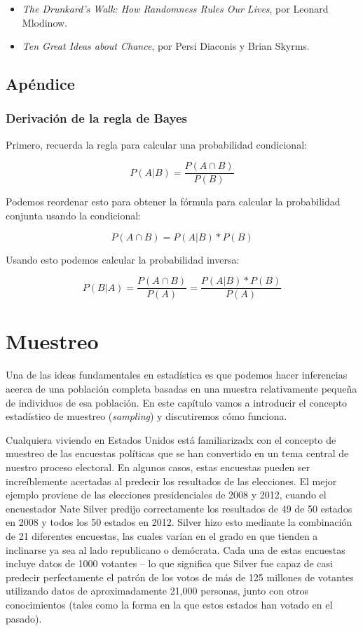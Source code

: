 \documentclass[
  12pt,
]{book}
\providecommand{\tightlist}{%
  \setlength{\itemsep}{0pt}\setlength{\parskip}{0pt}}
\begin{document}
\begin{itemize}
\tightlist
\item
  \emph{The Drunkard's Walk: How Randomness Rules Our Lives}, por Leonard Mlodinow.
\item
  \emph{Ten Great Ideas about Chance}, por Persi Diaconis y Brian Skyrms.
\end{itemize}

\hypertarget{apuxe9ndice-2}{%
\section{Apéndice}\label{apuxe9ndice-2}}

\hypertarget{derivaciuxf3n-de-la-regla-de-bayes}{%
\subsection{Derivación de la regla de Bayes}\label{derivaciuxf3n-de-la-regla-de-bayes}}

Primero, recuerda la regla para calcular una probabilidad condicional:

\[
P(A|B) = \frac{P(A \cap B)}{P(B)}
\]

Podemos reordenar esto para obtener la fórmula para calcular la probabilidad conjunta usando la condicional:

\[
P(A \cap B) = P(A|B) * P(B)
\]

Usando esto podemos calcular la probabilidad inversa:

\[
P(B|A) = \frac{P(A \cap B)}{P(A)} =   \frac{P(A|B)*P(B)}{P(A)}
\]

\hypertarget{sampling}{%
\chapter{Muestreo}\label{sampling}}

Una de las ideas fundamentales en estadística es que podemos hacer inferencias acerca de una población completa basadas en una muestra relativamente pequeña de individuos de esa población. En este capítulo vamos a introducir el concepto estadístico de muestreo (\emph{sampling}) y discutiremos cómo funciona.

Cualquiera viviendo en Estados Unidos está familiarizadx con el concepto de muestreo de las encuestas políticas que se han convertido en un tema central de nuestro proceso electoral. En algunos casos, estas encuestas pueden ser increíblemente acertadas al predecir los resultados de las elecciones. El mejor ejemplo proviene de las elecciones presidenciales de 2008 y 2012, cuando el encuestador Nate Silver predijo correctamente los resultados de 49 de 50 estados en 2008 y todos los 50 estados en 2012. Silver hizo esto mediante la combinación de 21 diferentes encuestas, las cuales varían en el grado en que tienden a inclinarse ya sea al lado republicano o demócrata. Cada una de estas encuestas incluye datos de 1000 votantes -- lo que significa que Silver fue capaz de casi predecir perfectamente el patrón de los votos de más de 125 millones de votantes utilizando datos de aproximadamente 21,000 personas, junto con otros conocimientos (tales como la forma en la que estos estados han votado en el pasado).
\end{document}
